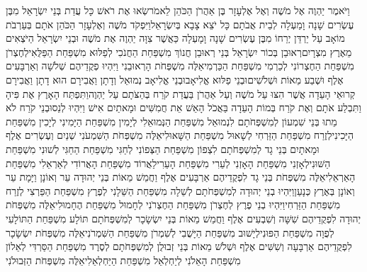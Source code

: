 \documentclass[../main/main.tex]{subfiles}
\begin{document}
\begin{multicols}{\ncols}
וַיֹּאמֶר יַהְוֶה אֶל מֹשֶׁה וְאֶל אֶלְעָזָר בֶּן אַהֲרֹן הַכֹּהֵן לֵאמֹר\PreVerseSpace{}שְׂאוּ אֶת רֹאשׁ כָּל עֲדַת בְּנֵי יִשְׂרָאֵל מִבֶּן עֶשְׂרִים שָׁנָה וָמַעְלָה לְבֵית אֲבֹתָם כָּל יֹצֵא צָבָא בְּיִשְׂרָאֵל\PreVerseSpace{}וַיִּפְקֹד\SubEnd{} מֹשֶׁה וְאֶלְעָזָר הַכֹּהֵן אֹתָם בְּעַרְבֹת מוֹאָב עַל יַרְדֵּן יְרֵחוֹ \PreVerseSpace{}מִבֶּן עֶשְׂרִים שָׁנָה וָמָעְלָה כַּאֲשֶׁר צִוָּה יַהְוֶה אֶת מֹשֶׁה וּבְנֵי יִשְׂרָאֵל הַיֹּצְאִים מֵאֶרֶץ מִצְרָיִם\PreVerseSpace{}רְאוּבֵן בְּכוֹר יִשְׂרָאֵל בְּנֵי רְאוּבֵן חֲנוֹךְ מִשְׁפַּחַת הַחֲנֹכִי לְפַלּוּא מִשְׁפַּחַת הַפַּלֻּאִי\PreVerseSpace{}לְחֶצְרֹן מִשְׁפַּחַת הַחֶצְרוֹנִי לְכַרְמִי מִשְׁפַּחַת הַכַּרְמִי\PreVerseSpace{}אֵלֶּה מִשְׁפְּחֹת הָרְאוּבֵנִי וַיִּהְיוּ פְקֻדֵיהֶם שְׁלֹשָׁה וְאַרְבָּעִים אֶלֶף וּשְׁבַע מֵאוֹת וּשְׁלֹשִׁים\PreVerseSpace{}וּבְנֵי פַלּוּא אֱלִיאָב\PreVerseSpace{}וּבְנֵי אֱלִיאָב נְמוּאֵל וְדָתָן וַאֲבִירָם הוּא דָתָן וַאֲבִירָם קְרוּאֵי הָעֵדָה אֲשֶׁר הִצּוּ עַל מֹשֶׁה וְעַל אַהֲרֹן בַּעֲדַת קֹרַח בְּהַצֹּתָם עַל יַהְוֶה\PreVerseSpace{}וַתִּפְתַּח הָאָרֶץ אֶת פִּיהָ וַתִּבְלַע אֹתָם וְאֶת קֹרַח בְּמוֹת הָעֵדָה בַּאֲכֹל הָאֵשׁ אֵת חֲמִשִּׁים וּמָאתַיִם אִישׁ וַיִּהְיוּ לְנֵס\PreVerseSpace{}וּבְנֵי קֹרַח לֹא מֵתוּ \ClosedSection{}בְּנֵי שִׁמְעוֹן לְמִשְׁפְּחֹתָם לִנְמוּאֵל מִשְׁפַּחַת הַנְּמוּאֵלִי לְיָמִין מִשְׁפַּחַת הַיָּמִינִי לְיָכִין מִשְׁפַּחַת הַיָּכִינִי\PreVerseSpace{}לְזֶרַח מִשְׁפַּחַת הַזַּרְחִי לְשָׁאוּל מִשְׁפַּחַת הַשָּׁאוּלִי\PreVerseSpace{}אֵלֶּה מִשְׁפְּחֹת הַשִּׁמְעֹנִי שְׁנַיִם וְעֶשְׂרִים אֶלֶף וּמָאתָיִם \ClosedSection{}בְּנֵי גָד לְמִשְׁפְּחֹתָם לִצְפוֹן מִשְׁפַּחַת הַצְּפוֹנִי לְחַגִּי מִשְׁפַּחַת הַחַגִּי לְשׁוּנִי מִשְׁפַּחַת הַשּׁוּנִי\PreVerseSpace{}לְאָזְנִי מִשְׁפַּחַת הָאָזְנִי לְעֵרִי מִשְׁפַּחַת הָעֵרִי\PreVerseSpace{}לַאֲרוֹד מִשְׁפַּחַת הָאֲרוֹדִי לְאַרְאֵלִי מִשְׁפַּחַת הָאַרְאֵלִי\PreVerseSpace{}אֵלֶּה מִשְׁפְּחֹת בְּנֵי גָד לִפְקֻדֵיהֶם אַרְבָּעִים אֶלֶף וַחֲמֵשׁ מֵאוֹת \ClosedSection{}בְּנֵי יְהוּדָה עֵר וְאוֹנָן וַיָּמָת עֵר וְאוֹנָן בְּאֶרֶץ כְּנָעַן\PreVerseSpace{}וַיִּהְיוּ בְנֵי יְהוּדָה לְמִשְׁפְּחֹתָם לְשֵׁלָה מִשְׁפַּחַת הַשֵּׁלָנִי לְפֶרֶץ מִשְׁפַּחַת הַפַּרְצִי לְזֶרַח מִשְׁפַּחַת הַזַּרְחִי\PreVerseSpace{}וַיִּהְיוּ בְנֵי פֶרֶץ לְחֶצְרֹן מִשְׁפַּחַת הַחֶצְרֹנִי לְחָמוּל מִשְׁפַּחַת הֶחָמוּלִי\PreVerseSpace{}אֵלֶּה מִשְׁפְּחֹת יְהוּדָה לִפְקֻדֵיהֶם שִׁשָּׁה וְשִׁבְעִים אֶלֶף וַחֲמֵשׁ מֵאוֹת \ClosedSection{}בְּנֵי יִשְׂשָׂכָר לְמִשְׁפְּחֹתָם תּוֹלָע מִשְׁפַּחַת הַתּוֹלָעִי לְפֻוָה מִשְׁפַּחַת הַפּוּנִי\PreVerseSpace{}לְיָשׁוּב מִשְׁפַּחַת הַיָּשֻׁבִי לְשִׁמְרֹן מִשְׁפַּחַת הַשִּׁמְרֹנִי\PreVerseSpace{}אֵלֶּה מִשְׁפְּחֹת יִשְׂשָׂכָר לִפְקֻדֵיהֶם אַרְבָּעָה וְשִׁשִּׁים אֶלֶף וּשְׁלֹשׁ מֵאוֹת \ClosedSection{}בְּנֵי זְבוּלֻן לְמִשְׁפְּחֹתָם לְסֶרֶד מִשְׁפַּחַת הַסַּרְדִּי לְאֵלוֹן מִשְׁפַּחַת הָאֵלֹנִי לְיַחְלְאֵל מִשְׁפַּחַת הַיַּחְלְאֵלִי\PreVerseSpace{}אֵלֶּה מִשְׁפְּחֹת הַזְּבוּלֹנִי 
\end{multicols}
\end{document}
